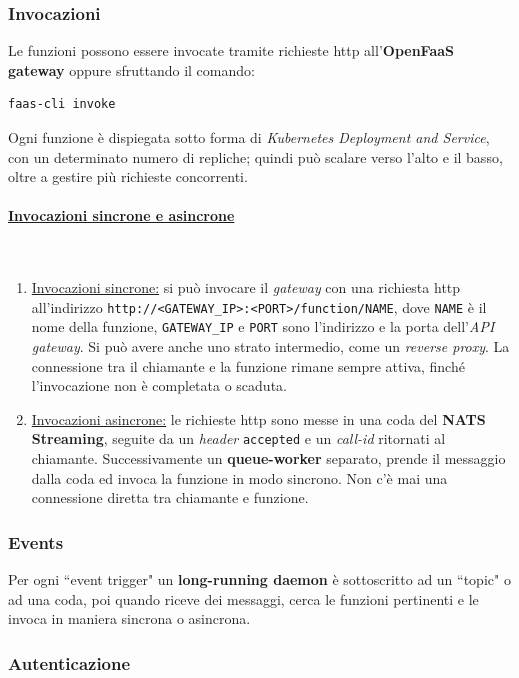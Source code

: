 \documentclass[12pt,a4paper,openany,twoside]{book}
\begin{document}
\subsubsection{Invocazioni}

Le funzioni possono essere invocate tramite richieste \ac{http} all'\textbf{OpenFaaS gateway} oppure sfruttando il comando:\begin{lstlisting}
faas-cli invoke\end{lstlisting}
\noindent
Ogni funzione è dispiegata sotto forma di \textit{Kubernetes Deployment and Service}, con un determinato numero di repliche; quindi può scalare verso l'alto e il basso, oltre a gestire più richieste concorrenti.

\paragraph{\underline{Invocazioni sincrone e asincrone}} ~\\
\begin{enumerate}
    \item \underline{Invocazioni sincrone:} si può invocare il \textit{gateway} con una richiesta \ac{http} all'indirizzo \texttt{http://<GATEWAY\_IP>:<PORT>/function/NAME}, dove \texttt{NAME} è il nome della funzione, \texttt{GATEWAY\_IP} e \texttt{PORT} sono l'indirizzo e la porta dell'\textit{API gateway}. Si può avere anche uno strato intermedio, come un \textit{reverse proxy}. La connessione tra il chiamante e la funzione rimane sempre attiva, finché l'invocazione non è completata o scaduta.
    \item \underline{Invocazioni asincrone:} le richieste \ac{http} sono messe in una coda del \textbf{NATS Streaming}, seguite da un \textit{header} \texttt{accepted} e un \textit{call-id} ritornati al chiamante. Successivamente un \textbf{queue-worker} separato, prende il messaggio dalla coda ed invoca la funzione in modo sincrono. Non c'è mai una connessione diretta tra chiamante e funzione.
\end{enumerate}

\subsubsection{Events}
Per ogni ``event trigger" un \textbf{long-running daemon} è sottoscritto ad un ``topic" o ad una coda, poi quando riceve dei messaggi, cerca le funzioni pertinenti e le invoca in maniera sincrona o asincrona.

\subsubsection{Autenticazione}
\end{document}
